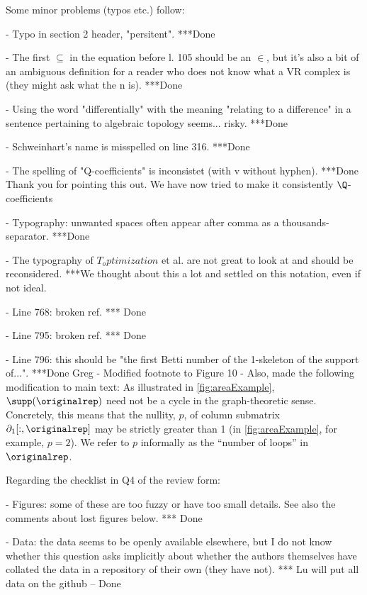 \documentclass{article}
\begin{document}
Some minor problems (typos etc.) follow:

- Typo in section 2 header, "persitent".
***Done

- The first $\subseteq$ in the equation before l. 105 should be an $\in$, but it's also a bit of an ambiguous definition for a reader who does not know what a VR complex is (they might ask what the n is).
***Done

- Using the word "differentially" with the meaning "relating to a difference" in a sentence pertaining to algebraic topology seems... risky.
***Done

- Schweinhart's name is misspelled on line 316.
***Done

- The spelling of "Q-coefficients" is inconsistet (with v without hyphen).
***Done
Thank you for pointing this out. We have now tried to make it consistently $\Q$-coefficients

- Typography: unwanted spaces often appear after comma as a
thousands-separator.
***Done

- The typography of $T_optimization$ et al. are not great to look at and should be reconsidered.
***We thought about this a lot and settled on this notation, even if not ideal.

- Line 768: broken ref. *** Done

- Line 795: broken ref. *** Done

- Line 796: this should be "the first Betti number of the 1-skeleton of the support of...". 
    ***Done 
    Greg
    - Modified footnote to Figure 10
    - Also, made the following modification to main text: As illustrated in \fig \ref{fig:areaExample}, $\supp(\originalrep)$ need not be a cycle in the graph-theoretic sense.  Concretely, this means that the nullity, $p$, of column submatrix $\partial_1[:,\originalrep]$ may be strictly greater than 1 (in \fig \ref{fig:areaExample}, for example, $p=2$).  We refer to $p$ informally as the ``number of loops'' in $\originalrep$. 

Regarding the checklist in Q4 of the review form:

- Figures: some of these are too fuzzy or have too small details. See also the comments about lost figures below. *** Done

- Data: the data seems to be openly available elsewhere, but I do not know whether this question asks implicitly about whether the authors themselves have collated the data in a repository of their own (they have not). *** Lu will put all data on the github -- Done
\end{document}
